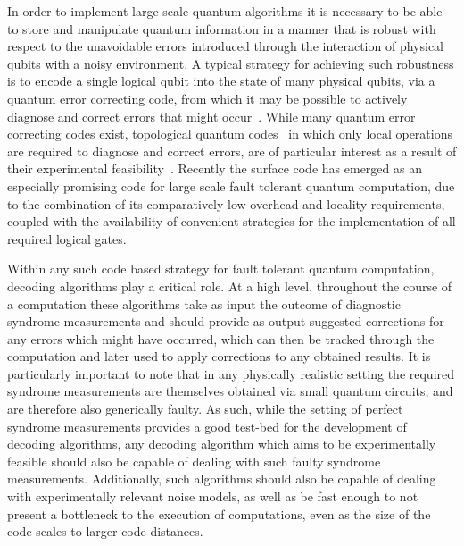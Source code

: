 \documentclass[twocolumn,preprintnumbers,amsmath,amssymb,notitlepage,nofootinbib,longbibliography,superscriptaddress,aps,pra,10pt]{revtex4-1}
\begin{document}
	In order to implement large scale quantum algorithms it is necessary to be able to store and manipulate quantum information in a manner that is robust with respect to the unavoidable errors introduced through the interaction of physical qubits with a noisy environment.
	A typical strategy for achieving such robustness is to encode a single logical qubit into the state of many physical qubits, via a quantum error correcting code, from which it may be possible to actively diagnose and correct errors that might occur~\cite{Terhal15,Campbell17}.
	While many quantum error correcting codes exist, topological quantum codes~\cite{Kitaev03, Dennis02, Preskill17lectures, Nayak08, Pachos12, Terhal15, Brown16, Campbell17} in which only local operations are required to diagnose and correct errors, are of particular interest as a result of their experimental feasibility~\cite{Reed12, Barends14, Nigg14, Corcoles15, Albrecht16, Takita16, Linke17}.
	Recently the surface code has emerged as an especially promising code for large scale fault tolerant quantum computation, due to the combination of its comparatively low overhead and locality requirements, coupled with the availability of convenient strategies for the implementation of all required logical gates.

	Within any such code based strategy for fault tolerant quantum computation, decoding algorithms play a critical role.
	At a high level, throughout the course of a computation these algorithms take as input the outcome of diagnostic syndrome measurements and should provide as output suggested corrections for any errors which might have occurred, which can then be tracked through the computation and later used to apply corrections to any obtained results.
	It is particularly important to note that in any physically realistic setting the required syndrome measurements are themselves obtained via small quantum circuits, and are therefore also generically faulty.
	As such, while the setting of perfect syndrome measurements provides a good test-bed for the development of decoding algorithms, any decoding algorithm which aims to be experimentally feasible should also be capable of dealing with such faulty syndrome measurements.
	Additionally, such algorithms should also be capable of dealing with experimentally relevant noise models, as well as be fast enough to not present a bottleneck to the execution of computations, even as the size of the code scales to larger code distances.
\end{document}
